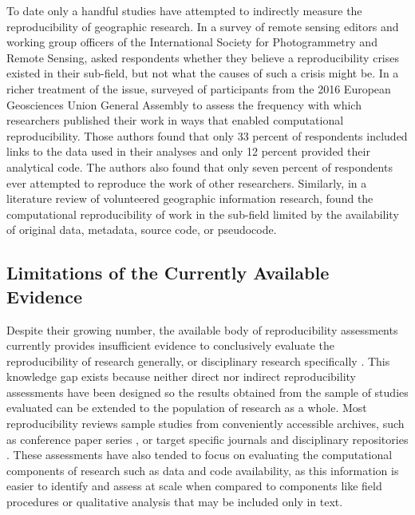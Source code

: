 To date only a handful studies have attempted to indirectly measure the reproducibility of geographic research.
In a survey of remote sensing editors and working group officers of the International Society for Photogrammetry and Remote Sensing, \citet{balz2020reproducibility} asked respondents whether they believe a reproducibility crises existed in their sub-field, but not what the causes of such a crisis might be.
In a richer treatment of the issue, \citet{konkol2019} surveyed of participants from the 2016 European Geosciences Union General Assembly to assess the frequency with which researchers published their work in ways that enabled computational reproducibility. 
Those authors found that only 33 percent of respondents included links to the data used in their analyses and only 12 percent provided their analytical code. 
The authors also found that only seven percent of respondents ever attempted to reproduce the work of other researchers.
Similarly, in a literature review of volunteered geographic information research, \citet{ostermann2017} found the computational reproducibility of work in the sub-field limited by the availability of original data, metadata, source code, or pseudocode.

\subsection*{Limitations of the Currently Available Evidence}
Despite their growing number, the available body of reproducibility assessments currently provides insufficient evidence to conclusively evaluate the reproducibility of research generally, or disciplinary research specifically \citep{NASEM2019}.
This knowledge gap exists because neither direct nor indirect reproducibility assessments have been designed so the results obtained from the sample of studies evaluated can be extended to the population of research as a whole.
Most reproducibility reviews sample studies from conveniently accessible archives, such as conference paper series \citep{gundersen2018state, ostermann2017}, or target specific journals and disciplinary repositories \citep{stodden2018empirical, stodden2018enabling, byrne_2017}.
These assessments have also tended to focus on evaluating the computational components of research such as data and code availability, as this information is easier to identify and assess at scale when compared to components like field procedures or qualitative analysis that may be included only in text. 

